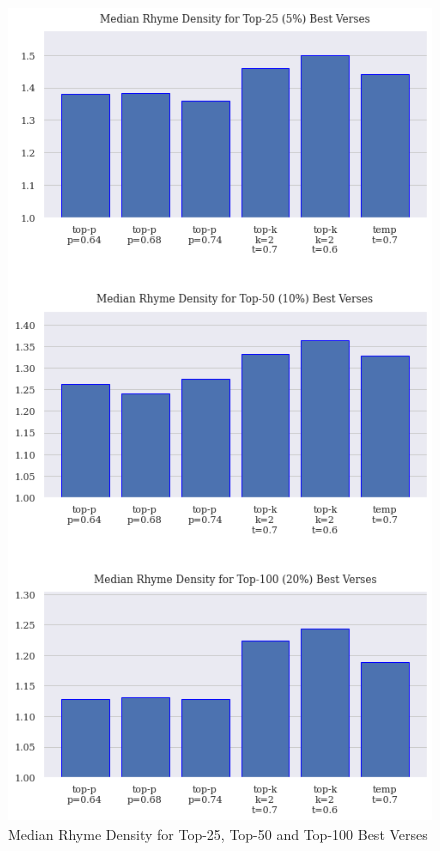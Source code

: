 \begin{figure}[h]
    \centering
    \includegraphics[scale=0.64, keepaspectratio=true]{figures/top_verse_rd_median.png}
    \caption{Median Rhyme Density for Top-25, Top-50 and Top-100 Best Verses}
    \label{fig:top_rd_median}
\end{figure}

